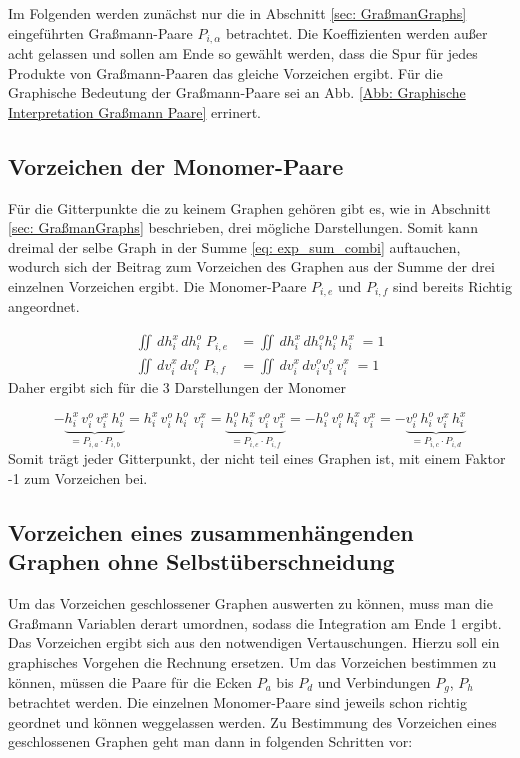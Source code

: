 
Im Folgenden werden zunächst nur die in Abschnitt \ref{sec: GraßmanGraphs} eingeführten Graßmann-Paare $P_{i,\alpha}$ betrachtet. Die Koeffizienten werden außer acht gelassen und sollen am Ende so gewählt werden, dass die Spur für jedes Produkte von Graßmann-Paaren das gleiche Vorzeichen ergibt. Für die Graphische Bedeutung der Graßmann-Paare sei an Abb. \ref{Abb: Graphische Interpretation Graßmann Paare} errinert. 
 
\subsection{Vorzeichen der Monomer-Paare} \label{sec: vorzeicehnMonomer}

Für die Gitterpunkte die zu keinem Graphen gehören gibt es, wie in Abschnitt \ref{sec: GraßmanGraphs} beschrieben, drei mögliche Darstellungen. Somit kann dreimal der selbe Graph in der Summe \eqref{eq: exp_sum_combi} auftauchen, wodurch sich der Beitrag zum Vorzeichen des Graphen aus der Summe der drei einzelnen Vorzeichen ergibt. Die Monomer-Paare $P_{i,e}$ und $P_{i,f}$ sind bereits Richtig angeordnet. 

\begin{align}
\iint \,dh_{i}^x\,dh_{i}^o \; P_{i,e} &= \iint \,dh_{i}^x\,dh_{i}^o h_{i}^o\,h_{i}^x\;  = 1\\
\iint \,dv_{i}^x\,dv_{i}^o \; P_{i,f} &= \iint \,dv_{i}^x\,dv_{i}^o v_{i}^o\,v_{i}^x\;  = 1
\end{align} Daher ergibt sich für die 3 Darstellungen der Monomer

\begin{equation}
-\underbrace{h_{i}^x\, v_{i}^o \,v_{i}^x\,h_{i}^o}_{= P_{i,a}\cdot P_{i,b}} 
= h_{i}^x\, v_{i}^o\, h_{i}^o\,\,v_{i}^x 
= \underbrace{h_{i}^o\,h_{i}^x\, v_{i}^o\,v_{i}^x }_{= P_{i,e}\cdot P_{i,f}}= - h_{i}^o\,v_{i}^o\,h_{i}^x\,v_{i}^x 
= -\underbrace{v_{i}^o\,h_{i}^o\,v_{i}^x\,h_{i}^x}_{= P_{i,c}\cdot P_{i,d}}
\end{equation} Somit trägt jeder Gitterpunkt, der nicht teil eines Graphen ist, mit einem Faktor -1 zum Vorzeichen bei.

\subsection{Vorzeichen eines zusammenhängenden Graphen ohne Selbstüberschneidung}

Um das Vorzeichen geschlossener Graphen auswerten zu können, muss man die Graßmann Variablen derart umordnen, sodass die Integration am Ende 1 ergibt. Das Vorzeichen ergibt sich aus den notwendigen Vertauschungen. Hierzu soll ein graphisches Vorgehen die Rechnung ersetzen. Um das Vorzeichen bestimmen zu können, müssen die Paare für die Ecken $P_a$ bis $P_d$ und Verbindungen $P_g$, $P_h$ betrachtet werden. Die einzelnen Monomer-Paare sind jeweils schon richtig geordnet und können weggelassen werden. Zu Bestimmung des Vorzeichen eines geschlossenen Graphen geht man dann in folgenden Schritten vor:

